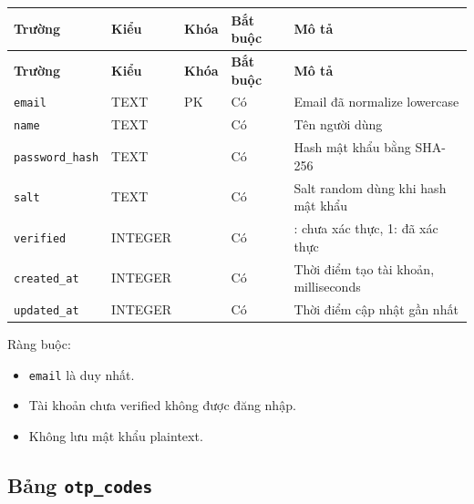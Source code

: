\documentclass[12pt,a4paper]{report}
\begin{document}
\begin{longtable}{|>{\raggedright\arraybackslash}p{}|>{\raggedright\arraybackslash}p{}|>{\raggedright\arraybackslash}p{}|>{\raggedright\arraybackslash}p{}|>{\raggedright\arraybackslash}p{}|}
\hline
\textbf{Trường} & \textbf{Kiểu} & \textbf{Khóa} & \textbf{Bắt buộc} & \textbf{Mô tả} \\ \hline
\endfirsthead
\hline
\textbf{Trường} & \textbf{Kiểu} & \textbf{Khóa} & \textbf{Bắt buộc} & \textbf{Mô tả} \\ \hline
\endhead
\texttt{email} & TEXT & PK & Có & Email đã normalize lowercase \\ \hline
\texttt{name} & TEXT &  & Có & Tên người dùng \\ \hline
\texttt{password\_hash} & TEXT &  & Có & Hash mật khẩu bằng SHA-256 \\ \hline
\texttt{salt} & TEXT &  & Có & Salt random dùng khi hash mật khẩu \\ \hline
\texttt{verified} & INTEGER &  & Có & 0: chưa xác thực, 1: đã xác thực \\ \hline
\texttt{created\_at} & INTEGER &  & Có & Thời điểm tạo tài khoản, milliseconds \\ \hline
\texttt{updated\_at} & INTEGER &  & Có & Thời điểm cập nhật gần nhất \\ \hline
\end{longtable}

Ràng buộc:

\begin{itemize}
\item \texttt{email} là duy nhất.
\item Tài khoản chưa verified không được đăng nhập.
\item Không lưu mật khẩu plaintext.
\end{itemize}

\subsection{Bảng \texttt{otp\_codes}}
\end{document}
